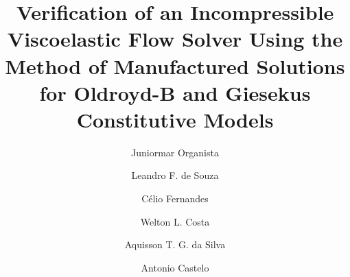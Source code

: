 \documentclass[preprint, 12pt]{elsarticle}
\begin{document}
\begin{frontmatter}



\title{{\color{red} Verification of an Incompressible Viscoelastic Flow Solver Using the Method of Manufactured Solutions for Oldroyd-B and Giesekus Constitutive Models}}


\author[1]{Juniormar Organista}
\author[1]{Leandro F. de Souza}
\author[2,3]{Célio Fernandes}
\author[1]{Welton L. Costa}
\author[1]{Aquisson T. G. da Silva}
\author[1]{Antonio Castelo}


\end{frontmatter}
\end{document}
